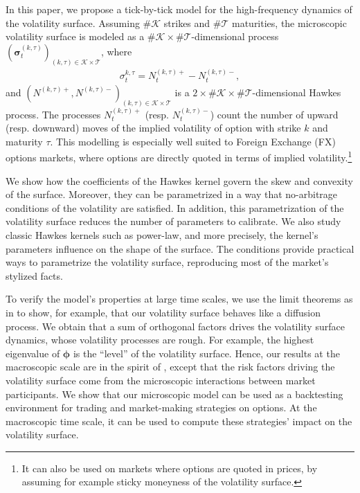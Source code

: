 \documentclass[12pt]{article}
\begin{document}
In this paper, we propose a tick-by-tick model for the high-frequency dynamics of the volatility surface. Assuming $\#\mathcal{K}$ strikes and $\#\mathcal{T}$ maturities, the microscopic volatility surface is modeled as a $\#\mathcal{K}\times \#\mathcal{T}$-dimensional process $(\boldsymbol{\sigma}_t^{(k,\tau)})_{(k,\tau)\in \mathcal{K}\times\mathcal{T}}$, where 
\begin{align*}
    \sigma_t^{k,\tau} = N_t^{(k,\tau)+}-N_t^{(k,\tau)-},
\end{align*}
and $(N^{(k,\tau)+},N^{(k,\tau)-})_{(k,\tau)\in\mathcal{K}\times\mathcal{T}}$ is a $2\times\#\mathcal{K}\times \#\mathcal{T}$-dimensional Hawkes process. The processes $N_t^{(k,\tau)+}$ (resp. $N_t^{(k,\tau)-}$) count the number of upward (resp. downward) moves of the implied volatility of option with strike $k$ and maturity $\tau$. This modelling is especially well suited to Foreign Exchange (FX) options markets, where options are directly quoted in terms of implied volatility.\footnote{It can also be used on markets where options are quoted in prices, by assuming for example sticky moneyness of the volatility surface.} \medskip

We show how the coefficients of the Hawkes kernel govern the skew and convexity of the surface. Moreover, they can be parametrized in a way that no-arbitrage conditions of the volatility are satisfied. In addition, this parametrization of the volatility surface reduces the number of parameters to calibrate. We also study classic Hawkes kernels such as power-law, and more precisely, the kernel's parameters influence on the shape of the surface. The conditions provide practical ways to parametrize the volatility surface, reproducing most of the market's stylized facts. \medskip

To verify the model's properties at large time scales, we use the limit theorems as in \cite{tomas2019microscopic} to show, for example, that our volatility surface behaves like a diffusion process. We obtain that a sum of orthogonal factors drives the volatility surface dynamics, whose volatility processes are rough. For example, the highest eigenvalue of $\boldsymbol{\phi}$ is the ``level'' of the volatility surface. Hence, our results at the macroscopic scale are in the spirit of \cite{cont2002dynamics}, except that the risk factors driving the volatility surface come from the microscopic interactions between market participants. We show that our microscopic model can be used as a backtesting environment for trading and market-making strategies on options. At the macroscopic time scale, it can be used to compute these strategies' impact on the volatility surface. 
\end{document}
